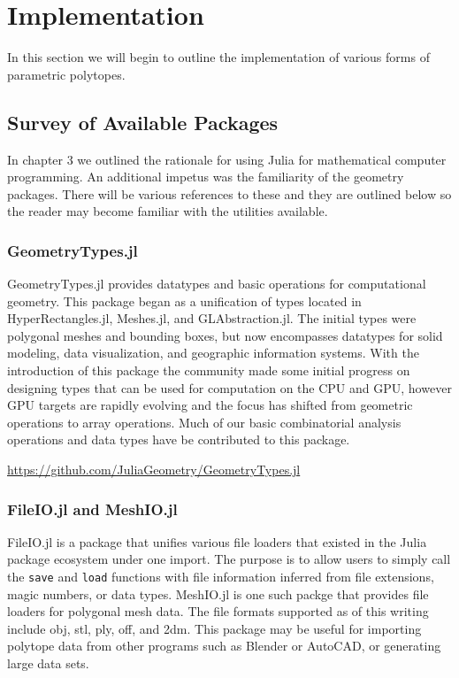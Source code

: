 \chapter{Implementation}

In this section we will begin to outline the implementation of
various forms of parametric polytopes.

\section{Survey of Available Packages}

In chapter 3 we outlined the rationale for using Julia for mathematical
computer programming. An additional impetus was the familiarity of the
geometry packages. There will be various references to these and they
are outlined below so the reader may become familiar with the utilities
available.

\subsection{GeometryTypes.jl}

GeometryTypes.jl provides datatypes and basic operations for computational
geometry. This package began as a unification of types located in
HyperRectangles.jl, Meshes.jl, and GLAbstraction.jl. The initial
types were polygonal meshes and bounding boxes, but now encompasses
datatypes for solid modeling, data visualization, and
geographic information systems.
With the introduction
of this package the community made some initial progress on designing
types that can be used for computation on the CPU and GPU, however
GPU targets are rapidly evolving and the focus has shifted from geometric
operations to array operations. Much of
our basic combinatorial analysis operations and data types have be contributed
to this package.

\url{https://github.com/JuliaGeometry/GeometryTypes.jl}

\subsection{FileIO.jl and MeshIO.jl}

FileIO.jl is a package that unifies various file loaders that existed in
the Julia package ecosystem under one import. The purpose is to
allow users to simply call the \texttt{save} and \texttt{load}
functions with file
information inferred from file extensions, magic numbers, or data types.
MeshIO.jl is one such packge that provides file loaders for
polygonal mesh data. The file formats supported as of this writing include
obj, stl, ply, off, and 2dm. This package may be useful for importing
polytope data from other programs such as Blender or AutoCAD, or generating
large data sets.

